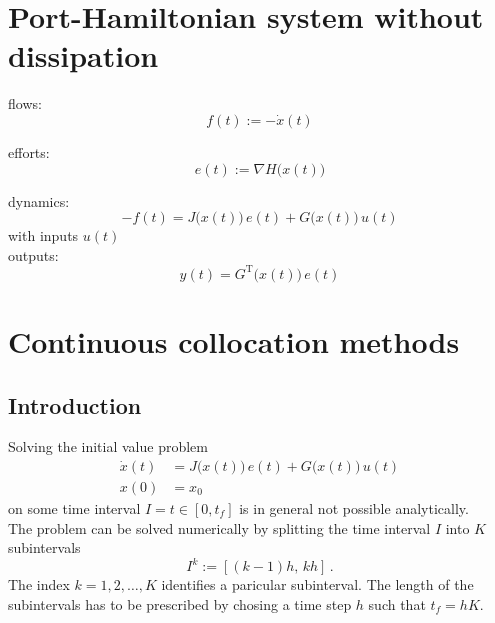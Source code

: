 \documentclass{scrartcl}
\begin{document}
\section{Port-Hamiltonian system without dissipation}

\noindent
flows:
\begin{equation*}
	f(t) := -\dot{x}(t)
\end{equation*}

\noindent
efforts:
\begin{equation*}
	e(t) := \nabla H \bigl( x(t) \bigr)
\end{equation*}

\noindent
dynamics:
\begin{equation*}
	-f(t) = J \bigl( x(t) \bigr) \, e(t) + G \bigl( x(t) \bigr) \, u(t)
\end{equation*}
with inputs $u(t)$ \\

\noindent
outputs:
\begin{equation*}
	y(t) = G^\mathrm{T} \bigl( x(t) \bigr) \, e(t)
\end{equation*}


\section{Continuous collocation methods}

\subsection{Introduction}

Solving the initial value problem
\begin{subequations}
	\begin{alignat}{1}
		\dot{x}(t) &= J \bigl( x(t) \bigr) \, e(t) + G \bigl( x(t) \bigr) \, u(t)
		\label{eq:ph_dynamics} \\
		x(0) &= x_0
		\label{eq:initial_condition}
	\end{alignat}
\end{subequations}
on some time interval $I = t \in \left[ 0, t_f \right]$
is in general not possible analytically. \\

The problem can be solved numerically
by splitting the time interval $I$ into $K$ subintervals
\begin{equation*}
	I^k :=
	\left[ \left( k-1 \right) h, \, k h \right]
	\,.
	\label{eq:subinterval}
\end{equation*}
The index $k = 1, 2, \ldots, K$ identifies a paricular subinterval.
The length of the subintervals has to be prescribed by chosing a time step $h$
such that $t_f = h K$. \\
\end{document}
